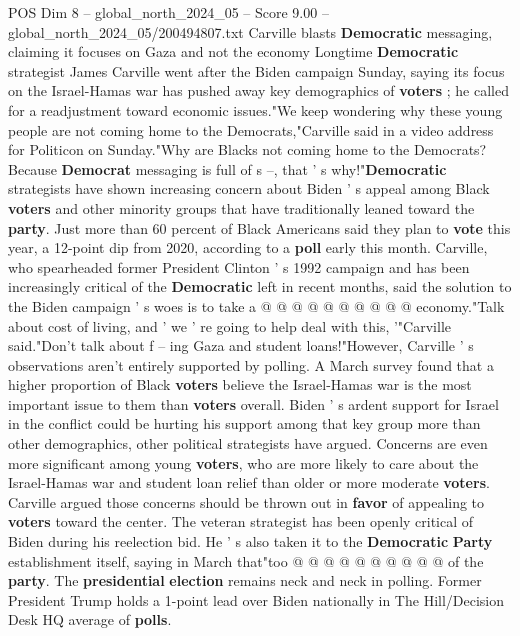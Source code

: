 \begin{textsample}{POS Dim 8 – global\_north\_2024\_05 – Score 9.00 – global\_north\_2024\_05/200494807.txt}  \label{ex:f8_pos_078}
Carville blasts \textbf{Democratic} messaging, claiming it focuses on Gaza and not the economy Longtime \textbf{Democratic} strategist James Carville went after the Biden campaign Sunday, saying its focus on the Israel-Hamas war has pushed away key demographics of \textbf{voters} ; he called for a readjustment toward economic issues."We keep wondering why these young people are not coming home to the Democrats,"Carville said in a video address for Politicon on Sunday."Why are Blacks not coming home to the Democrats?
Because \textbf{Democrat} messaging is full of s --, that ' s why!"\textbf{Democratic} strategists have shown increasing concern about Biden ' s appeal among Black \textbf{voters} and other minority groups that have traditionally leaned toward the \textbf{party}.
Just more than 60 percent of Black Americans said they plan to \textbf{vote} this year, a 12-point dip from 2020, according to a \textbf{poll} early this month.
Carville, who spearheaded former President Clinton ' s 1992 campaign and has been increasingly critical of the \textbf{Democratic} left in recent months, said the solution to the Biden campaign ' s woes is to take a @ @ @ @ @ @ @ @ @ @ economy."Talk about cost of living, and ' we ' re going to help deal with this, '"Carville said."Don't talk about f -- ing Gaza and student loans!"However, Carville ' s observations aren't entirely supported by polling.
A March survey found that a higher proportion of Black \textbf{voters} believe the Israel-Hamas war is the most important issue to them than \textbf{voters} overall.
Biden ' s ardent support for Israel in the conflict could be hurting his support among that key group more than other demographics, other political strategists have argued.
Concerns are even more significant among young \textbf{voters}, who are more likely to care about the Israel-Hamas war and student loan relief than older or more moderate \textbf{voters}.
Carville argued those concerns should be thrown out in \textbf{favor} of appealing to \textbf{voters} toward the center.
The veteran strategist has been openly critical of Biden during his reelection bid.
He ' s also taken it to the \textbf{Democratic} \textbf{Party} establishment itself, saying in March that"too @ @ @ @ @ @ @ @ @ @ of the \textbf{party}.
The \textbf{presidential} \textbf{election} remains neck and neck in polling.
Former President Trump holds a 1-point lead over Biden nationally in The Hill/Decision Desk HQ average of \textbf{polls}.

\end{textsample}
